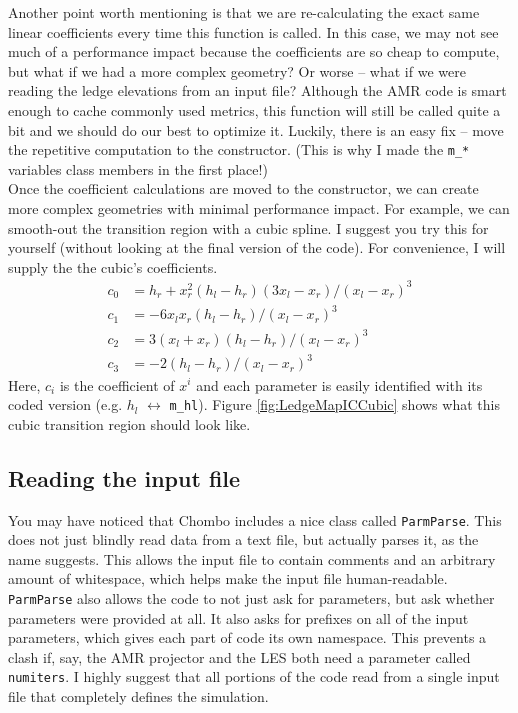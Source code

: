 \documentclass[12pt]{article}
\begin{document}
Another point worth mentioning is that we are re-calculating the exact same linear coefficients every time this function is called. In this case, we may not see much of a performance impact because the coefficients are so cheap to compute, but what if we had a more complex geometry? Or worse -- what if we were reading the ledge elevations from an input file? Although the AMR code is smart enough to cache commonly used metrics, this function will still be called quite a bit and we should do our best to optimize it. Luckily, there is an easy fix -- move the repetitive computation to the constructor. (This is why I made the \texttt{m\_*} variables class members in the first place!)\\

Once the coefficient calculations are moved to the constructor, we can create more complex geometries with minimal performance impact. For example, we can smooth-out the transition region with a cubic spline. I suggest you try this for yourself (without looking at the final version of the code). For convenience, I will supply the the cubic's coefficients.
\begin{align*}
	c_0 &= h_r + x_r^2 (h_l-h_r) (3x_l-x_r) / (x_l-x_r)^3\\
	c_1 &= -6 x_l x_r (h_l-h_r) / (x_l-x_r)^3\\
	c_2 &= 3 (x_l+x_r) (h_l-h_r) / (x_l-x_r)^3\\
	c_3 &= -2 (h_l-h_r) / (x_l-x_r)^3
\end{align*}
Here, $c_i$ is the coefficient of $x^i$ and each parameter is easily identified with its coded version (e.g. $h_l$ $\leftrightarrow$ \texttt{m\_hl}). Figure \ref{fig:LedgeMapICCubic} shows what this cubic transition region should look like.

\subsection{Reading the input file}\label{HowToReadFromTheInputFile}
You may have noticed that Chombo includes a nice class called \texttt{ParmParse}. This does not just blindly read data from a text file, but actually parses it, as the name suggests. This allows the input file to contain comments and an arbitrary amount of whitespace, which helps make the input file human-readable. \texttt{ParmParse} also allows the code to not just ask for parameters, but ask whether parameters were provided at all. It also asks for prefixes on all of the input parameters, which gives each part of code its own namespace. This prevents a clash if, say, the AMR projector and the LES both need a parameter called \texttt{numiters}. I highly suggest that all portions of the code read from a single input file that completely defines the simulation.\\
\end{document}
